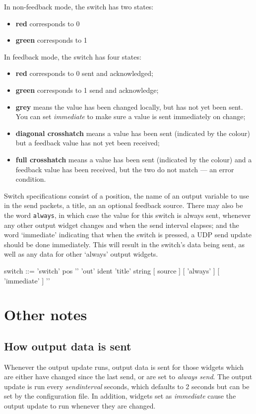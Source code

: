 In non-feedback mode, the switch has two states:
\begin{itemize}
\item \textbf{red} corresponds to 0
\item \textbf{green} corresponds to 1
\end{itemize}
In feedback mode, the switch has four states:
\begin{itemize}
\item \textbf{red} corresponds to 0 sent and acknowledged;
\item \textbf{green} corresponds to 1 send and acknowledge;
\item \textbf{grey} means the value has been changed locally, but has not yet been sent. You can set \emph{immediate} to
make sure a value is sent immediately on change;
\item \textbf{diagonal crosshatch} means a value has been sent (indicated by the colour) but a feedback value has
not yet been received;
\item \textbf{full crosshatch} means a value has been sent (indicated by the colour) and a feedback value has
been received, but the two do not match --- an error condition.
\end{itemize}
Switch specifications consist of a position, the name of an
output variable to use in the send packets, a title,
an an optional feedback source. There may also be the word \verb+always+, in which case the value for this switch
is always sent, whenever any other output widget changes and when the send interval elapses; and the word `immediate'
indicating that when the switch is pressed, a UDP send update should be done immediately. This will result in the
switch's data being sent, as well as any data for other `always' output widgets.
\begin{v}
switch      ::= 'switch' pos '{'
                    'out' ident
                    'title' string
                    [ source ]
                    [ 'always' ]
                    [ 'immediate' ]
                '}'
\end{v}


\section{Other notes}

\subsection{How output data is sent}
Whenever the output update runs, output data is sent for those widgets which are either have changed since the
last send, or are set to \emph{always send}. The output update is run every \emph{sendinterval} seconds, which defaults
to 2 seconds but can be set by the configuration file. In addition, widgets set as \emph{immediate} cause the output
update to run whenever they are changed.

